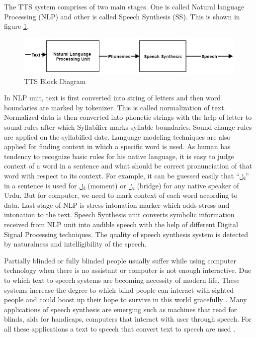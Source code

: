 The TTS system comprises of two main stages. One is called Natural language Processing (NLP) and
other is called Speech Synthesis (SS). This is shown in figure \ref{fig:TTS Block Diagram}.

\begin{center}
\begin{figure}[hbtp]
\centering
  \includegraphics[width=\linewidth]{images/tts_bd.jpg}
  \caption{TTS Block Diagram}
  \label{fig:TTS Block Diagram}
\end{figure}

\end{center}

In NLP unit, text is first converted into string of letters and then word boundaries are marked by
tokenizer. This is called normalization of text. Normalized data is then converted into phonetic strings
with the help of letter to sound rules after which Syllabifier marks syllable boundaries. Sound change
rules are applied on the syllabified date. Language modeling techniques are also applied for finding
context in which a specific word is used. As human has tendency to recognize basic rules for his native
language, it is easy to judge context of a word in a sentence and what should be correct pronunciation of
that word with respect to its context. For example, it can be guessed easily that \enquote{\texturdu{پل}} in a sentence is used
for \texturdu{پل} (moment) or \texturdu{پل} (bridge) for any native speaker of Urdu. But for computer, we need to mark context of each word according to data. 
Last stage of NLP is stress intonation marker which adds stress and intonation to the text. Speech Synthesis unit converts symbolic information
received from NLP unit into audible speech with the help of different Digital Signal Processing
techniques. The quality of speech synthesis system is detected by naturalness and intelligibility of the speech.

Partially blinded or fully blinded people usually suffer while using computer technology when there is no assistant or 
computer is not enough interactive. Due to which text to speech systems are becoming necessity of modern life. 
These systems increase the degree to which blind people can interact with sighted 
people \cite{klatt1987review} and could boost up their hope to survive in this world 
gracefully \cite{eide2004corpus}. Many applications of speech synthesis are emerging such as 
machines that read for blinds, aids for handicaps, computers that interact with user through speech. 
For all these applications a text to speech that convert text to speech are used \cite{klatt1982klattalk}.

